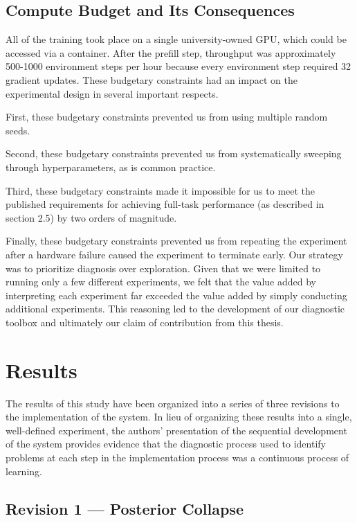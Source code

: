 \documentclass[12pt,a4paper,oneside]{report}
\begin{document}
\hypertarget{compute-budget-and-its-consequences}{%
\section{Compute Budget and Its Consequences}\label{compute-budget-and-its-consequences}}
All of the training took place on a single university-owned GPU, which could be accessed via a container. After the prefill step, throughput was approximately 500-1000 environment steps per hour because every environment step required 32 gradient updates. These budgetary constraints had an impact on the experimental design in several important respects.

First, these budgetary constraints prevented us from using multiple random seeds.

Second, these budgetary constraints prevented us from systematically sweeping through hyperparameters, as is common practice.

Third, these budgetary constraints made it impossible for us to meet the published requirements for achieving full-task performance (as described in section 2.5) by two orders of magnitude.

Finally, these budgetary constraints prevented us from repeating the experiment after a hardware failure caused the experiment to terminate early. Our strategy was to prioritize diagnosis over exploration. Given that we were limited to running only a few different experiments, we felt that the value added by interpreting each experiment far exceeded the value added by simply conducting additional experiments. This reasoning led to the development of our diagnostic toolbox and ultimately our claim of contribution from this thesis.
\newpage

\hypertarget{results}{%
\chapter{Results}\label{results}}

The results of this study have been organized into a series of three revisions to the implementation of the system. In lieu of organizing these results into a single, well-defined experiment, the authors' presentation of the sequential development of the system provides evidence that the diagnostic process used to identify problems at each step in the implementation process was a continuous process of learning.

\hypertarget{revision-1-posterior-collapse}{%
\section{Revision 1 --- Posterior Collapse}\label{revision-1-posterior-collapse}}
\end{document}
